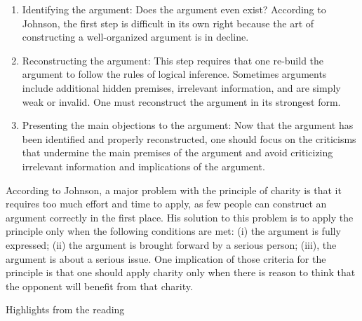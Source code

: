 \documentclass[
]{book}
\providecommand{\tightlist}{%
  \setlength{\itemsep}{0pt}\setlength{\parskip}{0pt}}
\begin{document}
\begin{enumerate}
\def\labelenumi{\arabic{enumi}.}
\tightlist
\item
  Identifying the argument: Does the argument even exist? According to Johnson, the first step is difficult in its own right because the art of constructing a well-organized argument is in decline.\\
\item
  Reconstructing the argument: This step requires that one re-build the argument to follow the rules of logical inference. Sometimes arguments include additional hidden premises, irrelevant information, and are simply weak or invalid. One must reconstruct the argument in its strongest form.\\
\item
  Presenting the main objections to the argument: Now that the argument has been identified and properly reconstructed, one should focus on the criticisms that undermine the main premises of the argument and avoid criticizing irrelevant information and implications of the argument.
\end{enumerate}

According to Johnson, a major problem with the principle of charity is that it requires too much effort and time to apply, as few people can construct an argument correctly in the first place. His solution to this problem is to apply the principle only when the following conditions are met: (i) the argument is fully expressed; (ii) the argument is brought forward by a serious person; (iii), the argument is about a serious issue. One implication of those criteria for the principle is that one should apply charity only when there is reason to think that the opponent will benefit from that charity.

Highlights from the reading
\end{document}
